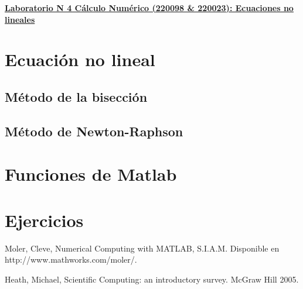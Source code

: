 \documentclass[12pt,letterpaper]{article}
\begin{document}
\hspace*{-1,5cm}

\vspace*{0.1cm} \centerline {\bf\underline{Laboratorio N 4 C\'alculo Num\'erico (220098 \& 220023): Ecuaciones no lineales}} \vskip0.5cm

\section{Ecuaci\'on no lineal}

\subsection{M\'etodo de la bisecci\'on}

\subsection{M\'etodo de Newton-Raphson}

\section{Funciones de Matlab}

\section{Ejercicios}

\begin{thebibliography}{9}


 Moler, Cleve, Numerical Computing with MATLAB, S.I.A.M. Disponible en http://www.mathworks.com/moler/.

 Heath, Michael, Scientific Computing: an introductory survey. McGraw Hill 2005.



\end{thebibliography}
\end{document}
